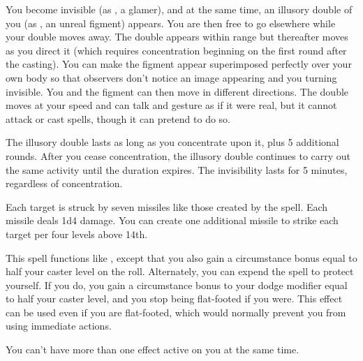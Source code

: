 \begin{spelleffect}
  You become invisible (as , a glamer), and at the same time, an illusory double of you (as , an unreal figment) appears. You are then free to go elsewhere while your double moves away. The double appears within range but thereafter moves as you direct it (which requires concentration beginning on the first round after the casting). You can make the figment appear superimposed perfectly over your own body so that observers don't notice an image appearing and you turning invisible. You and the figment can then move in different directions. The double moves at your speed and can talk and gesture as if it were real, but it cannot attack or cast spells, though it can pretend to do so.
  \par The illusory double lasts as long as you concentrate upon it, plus 5 additional rounds. After you cease concentration, the illusory double continues to carry out the same activity until the duration expires. The invisibility lasts for 5 minutes, regardless of concentration.
\end{spelleffect}

\begin{spelleffect}
  Each target is struck by seven missiles like those created by the  spell. Each missile deals 1d4 damage. You can create one additional missile to strike each target per four levels above 14th.
\end{spelleffect}

\begin{spelleffect}
  This spell functions like , except that you also gain a circumstance bonus equal to half your caster level on the roll. Alternately, you can expend the spell to protect yourself. If you do, you gain a circumstance bonus to your dodge modifier equal to half your caster level, and you stop being flat-footed if you were. This effect can be used even if you are flat-footed, which would normally prevent you from using immediate actions.
\end{spelleffect}
\begin{spellnotes}
  You can't have more than one  effect active on you at the same time.
\end{spellnotes}

